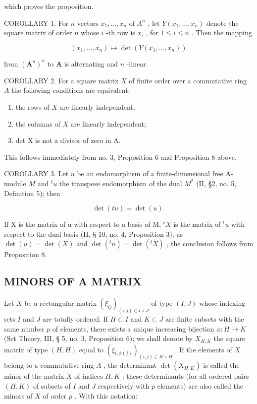 which proves the proposition.

COROLLARY 1. For \(n\) vectors \(x_1, \ldots, x_n\) of \(A^n\) , let \(Y(x_1, \ldots, x_n)\) denote the square matrix of order \(n\) whose \(i\) -th row is \(x_i\) , for \(1 \leqslant i \leqslant n\) . Then the mapping

\[
(x _ {1}, \dots , x _ {n}) \mapsto \det (Y (x _ {1}, \dots , x _ {n}))
\]

from \((\mathbf{A}^n)^n\) to \(\mathbf{A}\) is alternating and \(n\) -linear.

COROLLARY 2. For a square matrix \(X\) of finite order over a commutative ring \(A\) the following conditions are equivalent:

\begin{enumerate}
\def\labelenumi{(\roman{enumi})}
\item
  the rows of \(X\) are linearly independent;
\item
  the columns of \(X\) are linearly independent;
\item
  det X is not a divisor of zero in A.
\end{enumerate}

This follows immediately from no. 3, Proposition 6 and Proposition 8 above.

COROLLARY 3. Let \(u\) be an endomorphism of a finite-dimensional free A-module \(M\) and \({}^t u\) the transpose endomorphism of the dual \(M^*\) (II, §2, no. 5, Definition 5); then

\[
\det (t u) = \det (u).\tag{16}
\]

If X is the matrix of u with respect to a basis of M, \({}^{t}X\) is the matrix of \({}^{t}u\) with respect to the dual basis (II, § 10, no. 4, Proposition 3); as \(\det(u) = \det(X)\) and \(\det(^{t}u) = \det(^{t}X)\) , the conclusion follows from Proposition 8.

\subsection{MINORS OF A MATRIX}

Let \(X\) be a rectangular matrix \((\xi_{ij})_{(i,j)\in I\times J}\) of type \((I,J)\) whose indexing sets \(I\) and \(J\) are totally ordered. If \(H\subset I\) and \(K\subset J\) are finite subsets with the same number \(p\) of elements, there exists a unique increasing bijection \(\phi :H\to K\) (Set Theory, III, § 5, no. 3, Proposition 6); we shall denote by \(X_{H,K}\) the square matrix of type \((H,H)\) equal to \((\xi_{i,\phi (j)})_{(i,j)\in H\times H}\) . If the elements of \(X\) belong to a commutative ring \(A\) , the determinant \(\det (X_{H,K})\) is called the minor of the matrix \(X\) of indices \(H,K\) ; these determinants (for all ordered pairs \((H,K)\) of subsets of \(I\) and \(J\) respectively with \(p\) elements) are also called the minors of \(X\) of order \(p\) . With this notation:

